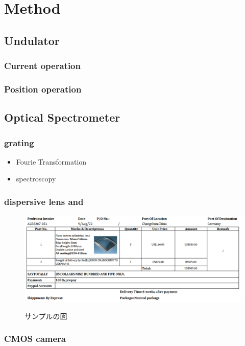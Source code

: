 \documentclass[a4paper,11pt,uplatex]{jsarticle}
\begin{document}
\section{Method}
\subsection{Undulator}
\subsubsection{Current operation}
\subsubsection{Position operation}

\subsection{Optical Spectrometer}
\subsubsection{grating}
\begin{itemize}
  \item Fourie Transformation
  \item spectroscopy
\end{itemize}
\subsubsection{dispersive lens and }
\begin{figure}[tb]
  \centering
  \includegraphics[width=0.8\linewidth]{image/3-lens.png}\\
  \caption{サンプルの図}
  \label{sample_image}
\end{figure}
\subsubsection{CMOS camera}
\end{document}
